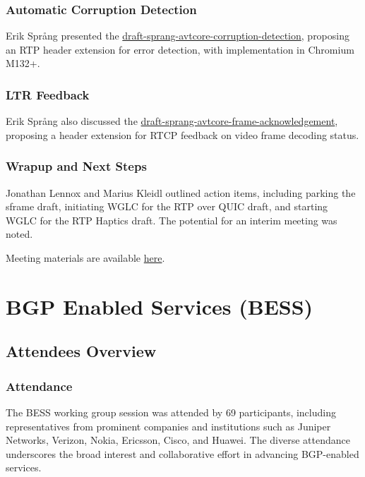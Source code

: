 \documentclass{article}
\begin{document}
\subsubsection{Automatic Corruption Detection}
Erik Språng presented the \href{https://datatracker.ietf.org/doc/draft-sprang-avtcore-corruption-detection}{draft-sprang-avtcore-corruption-detection}, proposing an RTP header extension for error detection, with implementation in Chromium M132+.

\subsubsection{LTR Feedback}
Erik Språng also discussed the \href{https://datatracker.ietf.org/doc/draft-sprang-avtcore-frame-acknowledgement}{draft-sprang-avtcore-frame-acknowledgement}, proposing a header extension for RTCP feedback on video frame decoding status.

\subsubsection{Wrapup and Next Steps}
Jonathan Lennox and Marius Kleidl outlined action items, including parking the sframe draft, initiating WGLC for the RTP over QUIC draft, and starting WGLC for the RTP Haptics draft. The potential for an interim meeting was noted.

Meeting materials are available \href{https://docs.google.com/presentation/d/1E_XfsZbcSMyNl-p3L8jUk2HkD1hfqY35TPzr0aXcV0w/}{here}.




\newpage

\section{BGP Enabled Services (BESS)}

\subsection{Attendees Overview}
\subsubsection{Attendance}
The BESS working group session was attended by 69 participants, including representatives from prominent companies and institutions such as Juniper Networks, Verizon, Nokia, Ericsson, Cisco, and Huawei. The diverse attendance underscores the broad interest and collaborative effort in advancing BGP-enabled services.
\end{document}
